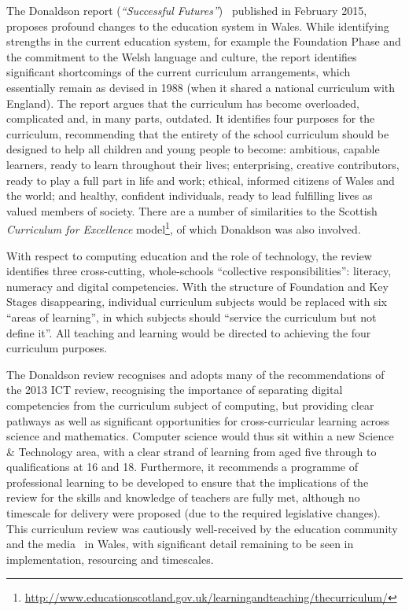 The Donaldson report (\emph{``Successful
Futures''})~\cite{Donaldson:2015} published in February 2015, proposes
profound changes to the education system in Wales. While identifying
strengths in the current education system, for example the Foundation
Phase and the commitment to the Welsh language and culture, the report
identifies significant shortcomings of the current curriculum
arrangements, which essentially remain as devised in 1988 (when it
shared a national curriculum with England). The report argues that the
curriculum has become overloaded, complicated and, in many parts,
outdated. It identifies four purposes for the curriculum, recommending
that the entirety of the school curriculum should be designed to help
all children and young people to become: ambitious, capable learners,
ready to learn throughout their lives; enterprising, creative
contributors, ready to play a full part in life and work; ethical,
informed citizens of Wales and the world; and healthy, confident
individuals, ready to lead fulfilling lives as valued members of
society. There are a number of similarities to the Scottish
{\emph{Curriculum for Excellence}}
model\footnote{\url{http://www.educationscotland.gov.uk/learningandteaching/thecurriculum/}},
of which Donaldson was also involved.

With respect to computing education and
the role of technology, the review identifies three cross-cutting,
whole-schools ``collective
responsibilities'': literacy, numeracy and digital competencies. With
the structure of Foundation and Key Stages disappearing, individual
curriculum subjects would be replaced with six ``areas of learning'',
in which subjects should ``service the curriculum but not define
it''. All teaching and learning would be directed to achieving the
four curriculum purposes.

The Donaldson review recognises and adopts many of the
recommendations of the 2013 ICT review, recognising the importance
of separating digital competencies from the curriculum subject of
computing, but providing clear pathways as well as significant
opportunities for cross-curricular learning across science and
mathematics. Computer science would thus sit within a new Science \&
Technology area, with a clear strand of learning from aged five
through to qualifications at 16 and 18. Furthermore, it recommends
a programme of professional learning to be developed to ensure that the
implications of the review for the skills and knowledge of teachers
are fully met, although no timescale for delivery were proposed (due
to the required legislative changes). This curriculum review was
cautiously well-received by the education community and the
media~\cite{bbcnewsdonaldson:2015} in Wales, with significant detail
remaining to be seen in implementation, resourcing and timescales.

